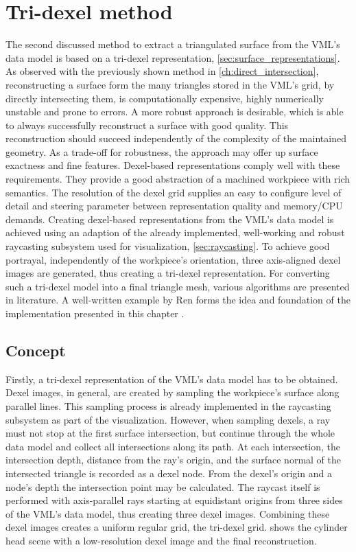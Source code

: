 
\chapter{Tri-dexel method}
\label{ch:tri_dexel}

The second discussed method to extract a triangulated surface from the VML's data model is based on a tri-dexel representation, \cf \cref{sec:surface_representations}.
As observed with the previously shown method in \cref{ch:direct_intersection}, reconstructing a surface form the many triangles stored in the VML's grid, by directly intersecting them, is computationally expensive, highly numerically unstable and prone to errors.
A more robust approach is desirable, which is able to always successfully reconstruct a surface with good quality.
This reconstruction should succeed independently of the complexity of the maintained geometry.
As a trade-off for robustness, the approach may offer up surface exactness and fine features.
Dexel-based representations comply well with these requirements.
They provide a good abstraction of a machined workpiece with rich semantics.
The resolution of the dexel grid supplies an easy to configure level of detail and steering parameter between representation quality and memory/CPU demands.
Creating dexel-based representations from the VML's data model is achieved using an adaption of the already implemented, well-working and robust raycasting subsystem used for visualization, \cf \cref{sec:raycasting}.
To achieve good portrayal, independently of the workpiece's orientation, three axis-aligned dexel images are generated, thus creating a tri-dexel representation.
For converting such a tri-dexel model into a final triangle mesh, various algorithms are presented in literature.
A well-written example by Ren \etal forms the idea and foundation of the implementation presented in this chapter \cite{tridexel_reconstruction}.


\section{Concept}
\label{sec:tri_dexel_concept}

Firstly, a tri-dexel representation of the VML's data model has to be obtained.
Dexel images, in general, are created by sampling the workpiece's surface along parallel lines.
This sampling process is already implemented in the raycasting subsystem as part of the visualization.
However, when sampling dexels, a ray must not stop at the first surface intersection, but continue through the whole data model and collect all intersections along its path.
At each intersection, the intersection depth, \ie distance from the ray's origin, and the surface normal of the intersected triangle is recorded as a dexel node.
From the dexel's origin and a node's depth the intersection point may be calculated.
The raycast itself is performed with axis-parallel rays starting at equidistant origins from three sides of the VML's data model, thus creating three dexel images.
Combining these dexel images creates a uniform regular grid, the tri-dexel grid.
 shows the cylinder head scene with a low-resolution dexel image and the final reconstruction.

